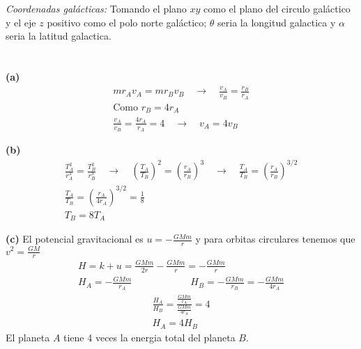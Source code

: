 \documentclass{article}
\begin{document}
\hfill

\textit{Coordenadas galácticas:} Tomando el plano $ xy  $ como el plano del circulo galáctico y el eje $ z  $ positivo como el polo norte galáctico; $ \theta  $ seria la longitud galactica y $ \alpha $ seria la latitud galactica.


\section{}

\hfill 

\textbf{(a)} 
\begin{gather*}
  m r_A v_A = m r_B v_B \quad \rightarrow \quad \frac{v_A }{v_B } = \frac{r_B }{r_A } \\
  \text{Como } r_B = 4r_A  \\ 
  \frac{v_A }{v_B } = \frac{4 r_A }{r_A } = 4 \quad \rightarrow \quad v_A = 4v_B
\end{gather*}

\hfill 

\textbf{(b)} 
\begin{gather*}
  \frac{T_A^2 }{r_A^3 } = \frac{T_B^2 }{r_B^3 } \quad \rightarrow \quad \left(\frac{T_A }{T_B }\right) ^2 = \left(\frac{r_A }{r_B }\right) ^ {3 } \quad \rightarrow \quad  \frac{T_A }{T_B }  = \left(\frac{r_A }{r_B }\right) ^ {3/2 } \\ 
  \frac{T_A }{T_B }  = \left(\frac{r_A }{4r_A }\right) ^ {3/2 } = \frac{1}{8} \\
  T_B = 8T_A
\end{gather*}

\hfill 

\textbf{(c) } El potencial gravitacional es $  u = - \frac{GMm }{r } $ y para orbitas circulares tenemos que $ v^2 = \frac{GM }{r } $
\begin{gather*}
  H = k+u = \frac{GMm }{2r } - \frac{GMm }{r } = - \frac{GMm }{r } \\
  H_A = -\frac{GMm }{r_A }  \qquad \qquad \qquad H_B = - \frac{GMm }{r_B } = - \frac{GMm }{4r_A}
\end{gather*}
\begin{gather*}
  \frac{H_A }{H_B } = \frac{\frac{GMm }{r_A }}{\frac{GMm }{4r_A }} =4\\
  H_A = 4H_B
\end{gather*}
El planeta $ A  $ tiene 4 veces la energia total del planeta $ B  $.

\section{}
\end{document}
